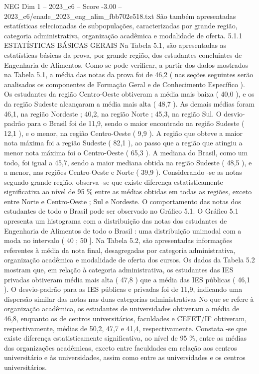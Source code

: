 \begin{textsample}{NEG Dim 1 – 2023\_c6 – Score -3.00 – 2023\_c6/enade\_2023\_eng\_alim\_fbb702e518.txt}
São também apresentadas estatísticas selecionadas de subpopulações, caracterizadas por grande região, categoria administrativa, organização acadêmica e modalidade de oferta. 5.1.1 ESTATÍSTICAS BÁSICAS GERAIS Na Tabela 5.1, são apresentadas as estatísticas básicas da prova, por grande região, dos estudantes concluintes de Engenharia de Alimentos.
Como se pode verificar, a partir dos dados mostrados na Tabela 5.1, a média das notas da prova foi de 46,2 ( nas seções seguintes serão analisados os componentes de Formação Geral e de Conhecimento Específico ).
Os estudantes da região Centro-Oeste obtiveram a média mais baixa ( 40,0 ), e os da região Sudeste alcançaram a média mais alta ( 48,7 ).
As demais médias foram 46,1, na região Nordeste ; 40,2, na região Norte ; 45,3, na região Sul.
O desvio-padrão para o Brasil foi de 11,9, sendo o maior encontrado na região Sudeste ( 12,1 ), e o menor, na região Centro-Oeste ( 9,9 ).
A região que obteve a maior nota máxima foi a região Sudeste ( 82,1 ), ao passo que a região que atingiu a menor nota máxima foi o Centro-Oeste ( 65,3 ).
A mediana do Brasil, como um todo, foi igual a 45,7, sendo a maior mediana obtida na região Sudeste ( 48,5 ), e a menor, nas regiões Centro-Oeste e Norte ( 39,9 ).
Considerando -se as notas segundo grande região, observa -se que existe diferença estatisticamente significativa ao nível de 95 \% entre as médias obtidas em todas as regiões, exceto entre Norte e Centro-Oeste ; Sul e Nordeste.
O comportamento das notas dos estudantes de todo o Brasil pode ser observado no Gráfico 5.1.
O Gráfico 5.1 apresenta um histograma com a distribuição das notas dos estudantes de Engenharia de Alimentos de todo o Brasil : uma distribuição unimodal com a moda no intervalo ( 40 ; 50 ].
Na Tabela 5.2, são apresentadas informações referentes à média da nota final, desagregadas por categoria administrativa, organização acadêmica e modalidade de oferta dos cursos.
Os dados da Tabela 5.2 mostram que, em relação à categoria administrativa, os estudantes das IES privadas obtiveram média mais alta ( 47,8 ) que a média das IES públicas ( 46,1 ).
O desvio-padrão para as IES públicas e privadas foi de 11,9, indicando uma dispersão similar das notas nas duas categorias administrativas No que se refere à organização acadêmica, os estudantes de universidades obtiveram a média de 46,8, enquanto os de centros universitários, faculdades e CEFET/IF obtiveram, respectivamente, médias de 50,2, 47,7 e 41,4, respectivamente.
Constata -se que existe diferença estatisticamente significativa, ao nível de 95 \%, entre as médias das organizações acadêmicas, exceto entre faculdades em relação aos centros universitário e às universidades, assim como entre as universidades e os centros universitários.

\end{textsample}
